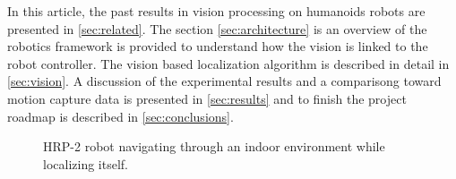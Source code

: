 In this article, the past results in vision processing on humanoids
robots are presented in \ref{sec:related}. The section
\ref{sec:architecture} is an overview of the robotics framework is
provided to understand how the vision is linked to the robot
controller. The vision based localization algorithm is described in
detail in \ref{sec:vision}. A discussion of the experimental results
and a comparisong toward motion capture data is presented in
\ref{sec:results} and to finish the project roadmap is described in
\ref{sec:conclusions}.

\begin{figure}[ht]
  \begin{center}
  \end{center}
  \caption{HRP-2 robot navigating through an indoor environment while
    localizing itself.\label{fig:xp_final}}
\end{figure}

